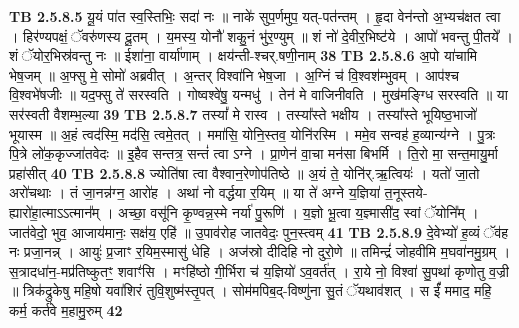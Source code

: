 \documentclass[17pt]{extarticle}
\begin{document}
                  \newline
                                \textbf{ TB 2.5.8.5} \newline
                  यू॒यं पा॑त स्व॒स्तिभिः॒ सदा॑ नः ॥ नाके॑ सुप॒र्णमुप॒ यत्-पत॑न्तम् । हृ॒दा वेन॑न्तो अ॒भ्यच॑क्षत त्वा । हिर॑ण्यपक्षं॒ ॅवरु॑णस्य दू॒तम् । य॒मस्य॒ योनौ॑ शकु॒नं भु॑र॒ण्युम् ॥ शं नो॑ दे॒वीर॒भिष्ट॑ये । आपो॑ भवन्तु पी॒तये᳚ । शं ॅयोर॒भिस्र॑वन्तु नः ॥ ईशा॑ना॒ वार्या॑णाम् । क्षय॑न्ती-श्चर्.षणी॒नाम् \textbf{ 38} \newline
                  \newline
                                \textbf{ TB 2.5.8.6} \newline
                  अ॒पो या॑चामि भेष॒जम् ॥ अ॒फ्सु मे॒ सोमो॑ अब्रवीत् । अ॒न्तर् विश्वा॑नि भेष॒जा । अ॒ग्निं च॑ वि॒श्वश॑म्भुवम् । आप॑श्च वि॒श्वभे॑षजीः ॥ यद॒फ्सु ते॑ सरस्वति । गोष्वश्वे॑षु॒ यन्मधु॑ । तेन॑ मे वाजिनीवति । मुख॑मङ्ग्धि सरस्वति ॥ या सर॑स्वती वैशम्भ॒ल्या \textbf{ 39} \newline
                  \newline
                                \textbf{ TB 2.5.8.7} \newline
                  तस्यां᳚ मे रास्व । तस्या᳚स्ते भक्षीय । तस्या᳚स्ते भूयिष्ठ॒भाजो॑ भूयास्म ॥ अ॒हं त्वद॑स्मि॒ मद॑सि॒ त्वमे॒तत् । ममा॑सि॒ योनि॒स्तव॒ योनि॑रस्मि । ममे॒व सन्वह॑ ह॒व्यान्य॑ग्ने । पु॒त्रः पि॒त्रे लो॑क॒कृज्जा॑तवेदः ॥ इ॒हैव सन्तत्र॒ सन्तं॑ त्वा ऽग्ने । प्रा॒णेन॑ वा॒चा मन॑सा बिभर्मि । ति॒रो मा॒ सन्त॒मायु॒र्मा प्रहा॑सीत् \textbf{ 40} \newline
                  \newline
                                \textbf{ TB 2.5.8.8} \newline
                  ज्योति॑षा त्वा वैश्वान॒रेणोप॑तिष्ठे ॥ अ॒यं ते॒ योनि॑र्.ऋ॒त्वियः॑ । यतो॑ जा॒तो अरो॑चथाः । तं जा॒नन्न॑ग्न॒ आरो॑ह । अथा॑ नो वर्द्धया र॒यिम् ॥ या ते॑ अग्ने य॒ज्ञिया॑ त॒नूस्तये-ह्यारो॑हा॒त्माऽऽत्मान᳚म् । अच्छा॒ वसू॑नि कृ॒ण्वन्न॒स्मे नर्या॑ पु॒रूणि॑ । य॒ज्ञो भू॒त्वा य॒ज्ञ्मासी॑द॒ स्वां ॅयोनि᳚म् । जात॑वेदो॒ भुव॒ आजाय॑मानः॒ सक्ष॑य॒ एहि॑ ॥ उ॒पाव॑रोह जातवेदः॒ पुन॒स्त्वम् \textbf{ 41} \newline
                  \newline
                                \textbf{ TB 2.5.8.9} \newline
                  दे॒वेभ्यो॑ ह॒व्यं ॅव॑ह नः प्रजा॒नन्न् । आयुः॑ प्र॒जाꣳ र॒यिम॒स्मासु॑ धेहि । अज॑स्रो दीदिहि नो दुरो॒णे ॥ तमिन्द्रं॑ जोहवीमि म॒घवा॑नमु॒ग्रम् । स॒त्रादधा॑न॒-मप्र॑तिष्कुतꣳ॒॒ शवाꣳ॑सि । मꣳहि॑ष्ठो गी॒र्भिरा च॑ य॒ज्ञियो॑ ऽव॒वर्त॑त् । रा॒ये नो॒ विश्वा॑ सु॒पथा॑ कृणोतु व॒ज्री ॥ त्रिक॑द्रुकेषु महि॒षो यवा॑शिरं तुवि॒शुष्म॑स्तृ॒पत् । सोम॑मपिब॒द्-विष्णु॑ना सु॒तं ॅयथाव॑शत् । स ईं᳚ ममाद॒ महि॒ कर्म॒ कर्त॑वे म॒हामु॒रुम् \textbf{ 42} \newline
\end{document}
